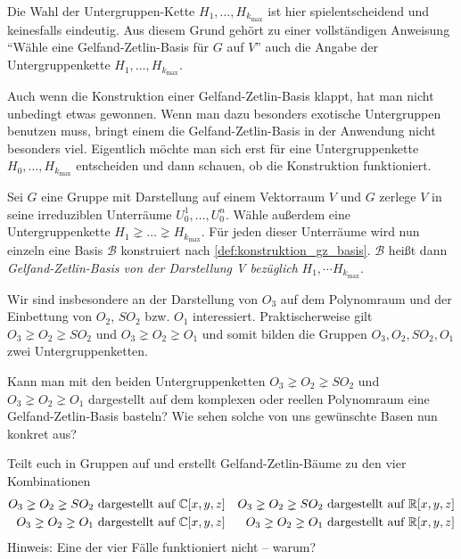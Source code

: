 \begin{remark}
		Die Wahl der Untergruppen-Kette $H_1,\ldots,H_{k_{\text{max}}}$ ist hier spielentscheidend und keinesfalls eindeutig. Aus diesem Grund gehört zu einer vollständigen Anweisung \enquote{Wähle eine Gelfand-Zetlin-Basis für $G$ auf $V$} auch die Angabe der Untergruppenkette $H_1,\ldots,H_{k_{\text{max}}}$.
\end{remark}
\begin{remark}
	Auch wenn die Konstruktion einer Gelfand-Zetlin-Basis klappt, hat man nicht unbedingt etwas gewonnen. Wenn man dazu besonders exotische Untergruppen benutzen muss, bringt einem die Gelfand-Zetlin-Basis in der Anwendung nicht besonders viel. Eigentlich möchte man sich erst für eine Untergruppenkette $H_0,\ldots,H_{k_{\text{max}}}$ entscheiden und dann schauen, ob die Konstruktion funktioniert.
\end{remark}
\begin{definition}[$\Gae\jae\el\soft\fae\aaa\en\dae$-$\Zae\jae\tae\el\iii\en$-$\Bae\aaa\sae\aaa$]
	\label{def:gz_basis}
	Sei $G$ eine Gruppe mit Darstellung auf einem Vektorraum $V$ und $G$ zerlege $V$ in seine irreduziblen Unterräume $U^1_0,\ldots,U^n_0$. Wähle außerdem eine Untergruppenkette $H_1 \gneq\ldots\gneq H_{k_{\text{max}}}$. Für jeden dieser Unterräume wird nun einzeln eine Basis $\mathcal{B}$ konstruiert nach \ref{def:konstruktion_gz_basis}. $\mathcal{B}$ heißt dann \emph{Gelfand-Zetlin-Basis von der Darstellung V bezüglich} $H_1,\cdots H_{k_{\text{max}}}$. 
\end{definition}

\begin{remark}
	Wir sind insbesondere an der Darstellung von $O_3$ auf dem Polynomraum und der Einbettung von $O_2$, $SO_2$ bzw. $O_1$ interessiert. Praktischerweise gilt $O_3\gneq O_2\gneq SO_2$ und  $O_3\gneq O_2\gneq O_1$ und somit bilden die Gruppen $O_3, O_2, SO_2, O_1$ zwei Untergruppenketten.
\end{remark}

\begin{centralquestion}[Fortsetzung]\label{cq:fortsetzung}
	Kann man mit den beiden Untergruppenketten $O_3\gneq O_2\gneq SO_2$ und  $O_3\gneq O_2\gneq O_1$ dargestellt auf dem komplexen oder reellen Polynomraum eine Gelfand-Zetlin-Basis basteln? Wie sehen solche von uns gewünschte Basen nun konkret aus?

	Teilt euch in Gruppen auf und erstellt Gelfand-Zetlin-Bäume zu den vier Kombinationen
	\begin{align*}
		O_3\gneq O_2\gneq SO_2 \text{ dargestellt auf }& \mathbb{C}[x,y,z] & O_3\gneq O_2\gneq SO_2 \text{ dargestellt auf }& \mathbb{R}[x,y,z] \\
		O_3\gneq O_2\gneq O_1 \text{ dargestellt auf }& \mathbb{C}[x,y,z] & O_3\gneq O_2\gneq O_1 \text{ dargestellt auf }& \mathbb{R}[x,y,z]
	\end{align*}
	Hinweis: Eine der vier Fälle funktioniert nicht -- warum?
\end{centralquestion}

